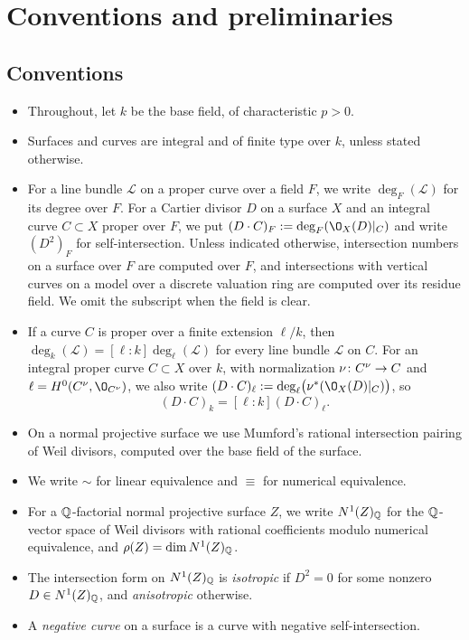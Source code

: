 \section{Conventions and preliminaries}\label{sec:setup}
\subsection{Conventions}\label{subsec:conventions}
\begin{itemize}
\item Throughout, let $k$ be the base field, of characteristic $p>0$.
\item Surfaces and curves are integral and of finite type over $k$, unless stated otherwise.
\item For a line bundle $\mathcal L$ on a proper curve over a field $F$, we write $\deg_F(\mathcal L)$ for its degree over $F$.
  For a Cartier divisor $D$ on a surface $X$ and an integral curve $C\subset X$ proper over $F$, we put $(D\cdot C)_F := \deg_F(\O_X(D)|_C)$ and write $(D^2)_F$ for self-intersection.
  Unless indicated otherwise, intersection numbers on a surface over $F$ are computed over $F$, and intersections with vertical curves on a model over a discrete valuation ring are computed over its residue field.
  We omit the subscript when the field is clear.
\item If a curve $C$ is proper over a finite extension $\ell/k$, then $\deg_k(\mathcal L) = [\ell:k]\deg_\ell(\mathcal L)$ for every line bundle $\mathcal L$ on $C$.
  For an integral proper curve $C\subset X$ over $k$, with normalization $\nu\colon C^\nu\to C$ and $\ell = H^0(C^\nu,\O_{C^\nu})$, we also write $(D\cdot C)_\ell := \deg_\ell\bigl(\nu^*(\O_X(D)|_C)\bigr)$, so
  \[
    (D\cdot C)_k = [\ell:k](D\cdot C)_\ell.
  \]
\item On a normal projective surface we use Mumford's rational intersection pairing of Weil divisors, computed over the base field of the surface.
\item We write $\sim$ for linear equivalence and $\equiv$ for numerical equivalence.
\item For a $\mathbb{Q}$-factorial normal projective surface $Z$, we write $N^1(Z)_{\mathbb{Q}}$ for the $\mathbb{Q}$-vector space of Weil divisors with rational coefficients modulo numerical equivalence, and $\rho(Z) = \dim N^1(Z)_{\mathbb{Q}}$.
\item The intersection form on $N^1(Z)_{\mathbb{Q}}$ is \emph{isotropic} if $D^2 = 0$ for some nonzero $D\in N^1(Z)_{\mathbb{Q}}$, and \emph{anisotropic} otherwise.
\item A \emph{negative curve} on a surface is a curve with negative self-intersection.

\end{itemize}
